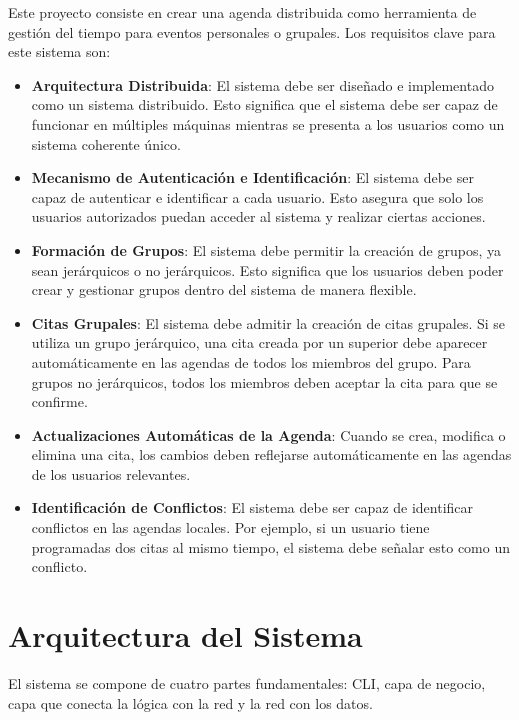 \documentclass[10pt]{article} %
\begin{document}
	Este proyecto consiste en crear una agenda distribuida como herramienta de gestión del tiempo para eventos personales o grupales. Los requisitos clave para este sistema son:
	
	\begin{itemize}
		\item \textbf{Arquitectura Distribuida}: El sistema debe ser diseñado e implementado como un sistema distribuido. Esto significa que el sistema debe ser capaz de funcionar en múltiples máquinas mientras se presenta a los usuarios como un sistema coherente único.
		
		\item \textbf{Mecanismo de Autenticación e Identificación}: El sistema debe ser capaz de autenticar e identificar a cada usuario. Esto asegura que solo los usuarios autorizados puedan acceder al sistema y realizar ciertas acciones.
		
		\item \textbf{Formación de Grupos}: El sistema debe permitir la creación de grupos, ya sean jerárquicos o no jerárquicos. Esto significa que los usuarios deben poder crear y gestionar grupos dentro del sistema de manera flexible.
		
		\item \textbf{Citas Grupales}: El sistema debe admitir la creación de citas grupales. Si se utiliza un grupo jerárquico, una cita creada por un superior debe aparecer automáticamente en las agendas de todos los miembros del grupo. Para grupos no jerárquicos, todos los miembros deben aceptar la cita para que se confirme.
		
		\item \textbf{Actualizaciones Automáticas de la Agenda}: Cuando se crea, modifica o elimina una cita, los cambios deben reflejarse automáticamente en las agendas de los usuarios relevantes.
		
		\item \textbf{Identificación de Conflictos}: El sistema debe ser capaz de identificar conflictos en las agendas locales. Por ejemplo, si un usuario tiene programadas dos citas al mismo tiempo, el sistema debe señalar esto como un conflicto.
		
	\end{itemize}
	
	\section{Arquitectura del Sistema}
	
	El sistema se compone de cuatro partes fundamentales: CLI, capa de negocio, capa que conecta la l\'ogica con la red y la red con los datos.
	
\end{document}
